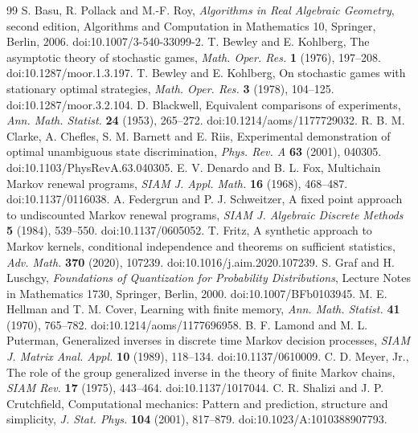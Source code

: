 \begin{thebibliography}{99}
S. Basu, R. Pollack and M.-F. Roy, \emph{Algorithms in Real Algebraic Geometry}, second edition, Algorithms and Computation in Mathematics 10, Springer, Berlin, 2006. doi:10.1007/3-540-33099-2.
T. Bewley and E. Kohlberg, The asymptotic theory of stochastic games, \emph{Math. Oper. Res.} \textbf{1} (1976), 197--208. doi:10.1287/moor.1.3.197.
T. Bewley and E. Kohlberg, On stochastic games with stationary optimal strategies, \emph{Math. Oper. Res.} \textbf{3} (1978), 104--125. doi:10.1287/moor.3.2.104.
D. Blackwell, Equivalent comparisons of experiments, \emph{Ann. Math. Statist.} \textbf{24} (1953), 265--272. doi:10.1214/aoms/1177729032.
R. B. M. Clarke, A. Chefles, S. M. Barnett and E. Riis, Experimental demonstration of optimal unambiguous state discrimination, \emph{Phys. Rev. A} \textbf{63} (2001), 040305. doi:10.1103/PhysRevA.63.040305.
E. V. Denardo and B. L. Fox, Multichain Markov renewal programs, \emph{SIAM J. Appl. Math.} \textbf{16} (1968), 468--487. doi:10.1137/0116038.
A. Federgrun and P. J. Schweitzer, A fixed point approach to undiscounted Markov renewal programs, \emph{SIAM J. Algebraic Discrete Methods} \textbf{5} (1984), 539--550. doi:10.1137/0605052.
T. Fritz, A synthetic approach to Markov kernels, conditional independence and theorems on sufficient statistics, \emph{Adv. Math.} \textbf{370} (2020), 107239. doi:10.1016/j.aim.2020.107239.
S. Graf and H. Luschgy, \emph{Foundations of Quantization for Probability Distributions}, Lecture Notes in Mathematics 1730, Springer, Berlin, 2000. doi:10.1007/BFb0103945.
M. E. Hellman and T. M. Cover, Learning with finite memory, \emph{Ann. Math. Statist.} \textbf{41} (1970), 765--782. doi:10.1214/aoms/1177696958.
B. F. Lamond and M. L. Puterman, Generalized inverses in discrete time Markov decision processes, \emph{SIAM J. Matrix Anal. Appl.} \textbf{10} (1989), 118--134. doi:10.1137/0610009.
C. D. Meyer, Jr., The role of the group generalized inverse in the theory of finite Markov chains, \emph{SIAM Rev.} \textbf{17} (1975), 443--464. doi:10.1137/1017044.
C. R. Shalizi and J. P. Crutchfield, Computational mechanics: Pattern and prediction, structure and simplicity, \emph{J. Stat. Phys.} \textbf{104} (2001), 817--879. doi:10.1023/A:1010388907793.
\end{thebibliography}
